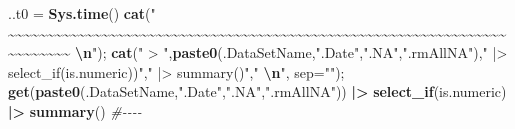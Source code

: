 \documentclass[
]{article}
\newenvironment{Shaded}{\begin{snugshade}}{\end{snugshade}}
\newcommand{\AttributeTok}[1]{\textcolor[rgb]{0.13,0.29,0.53}{#1}}
\newcommand{\CommentTok}[1]{\textcolor[rgb]{0.56,0.35,0.01}{\textit{#1}}}
\newcommand{\FunctionTok}[1]{\textcolor[rgb]{0.13,0.29,0.53}{\textbf{#1}}}
\newcommand{\NormalTok}[1]{#1}
\newcommand{\OtherTok}[1]{\textcolor[rgb]{0.56,0.35,0.01}{#1}}
\newcommand{\SpecialCharTok}[1]{\textcolor[rgb]{0.81,0.36,0.00}{\textbf{#1}}}
\newcommand{\StringTok}[1]{\textcolor[rgb]{0.31,0.60,0.02}{#1}}
\begin{document}
\begin{Shaded}
\begin{Highlighting}[]
  
\NormalTok{..t0 }\OtherTok{=} \FunctionTok{Sys.time}\NormalTok{()}
\FunctionTok{cat}\NormalTok{(}\StringTok{"    \textasciitilde{}\textasciitilde{}\textasciitilde{}\textasciitilde{}\textasciitilde{}\textasciitilde{}\textasciitilde{}\textasciitilde{}\textasciitilde{}\textasciitilde{}\textasciitilde{}\textasciitilde{}\textasciitilde{}\textasciitilde{}\textasciitilde{}\textasciitilde{}\textasciitilde{}\textasciitilde{}\textasciitilde{}\textasciitilde{}\textasciitilde{}\textasciitilde{}\textasciitilde{}\textasciitilde{}\textasciitilde{}\textasciitilde{}\textasciitilde{}\textasciitilde{}\textasciitilde{}\textasciitilde{}\textasciitilde{}\textasciitilde{}\textasciitilde{}\textasciitilde{}\textasciitilde{}\textasciitilde{}\textasciitilde{}\textasciitilde{}\textasciitilde{}\textasciitilde{}\textasciitilde{}\textasciitilde{}\textasciitilde{}\textasciitilde{}\textasciitilde{}\textasciitilde{}\textasciitilde{}\textasciitilde{}\textasciitilde{}\textasciitilde{}\textasciitilde{}\textasciitilde{}\textasciitilde{}\textasciitilde{}\textasciitilde{}\textasciitilde{}\textasciitilde{}\textasciitilde{}\textasciitilde{}\textasciitilde{}\textasciitilde{}\textasciitilde{}\textasciitilde{}\textasciitilde{}\textasciitilde{}\textasciitilde{}\textasciitilde{}\textasciitilde{}\textasciitilde{}\textasciitilde{}\textasciitilde{}\textasciitilde{}    }\SpecialCharTok{\textbackslash{}n}\StringTok{"}\NormalTok{); }\FunctionTok{cat}\NormalTok{(}\StringTok{" \textgreater{} "}\NormalTok{,}\FunctionTok{paste0}\NormalTok{(.DataSetName,}\StringTok{".Date"}\NormalTok{,}\StringTok{".NA"}\NormalTok{,}\StringTok{".rmAllNA"}\NormalTok{),}\StringTok{" |\textgreater{} select\_if(is.numeric))"}\NormalTok{,}\StringTok{" |\textgreater{} summary()"}\NormalTok{,}\StringTok{"  }\SpecialCharTok{\textbackslash{}n}\StringTok{"}\NormalTok{, }\AttributeTok{sep=}\StringTok{""}\NormalTok{); }\FunctionTok{get}\NormalTok{(}\FunctionTok{paste0}\NormalTok{(.DataSetName,}\StringTok{".Date"}\NormalTok{,}\StringTok{".NA"}\NormalTok{,}\StringTok{".rmAllNA"}\NormalTok{)) }\SpecialCharTok{|\textgreater{}} \FunctionTok{select\_if}\NormalTok{(is.numeric) }\SpecialCharTok{|\textgreater{}} \FunctionTok{summary}\NormalTok{() }\CommentTok{\#{-}{-}{-}{-}  }

\end{Highlighting}
\end{Shaded}
\end{document}
